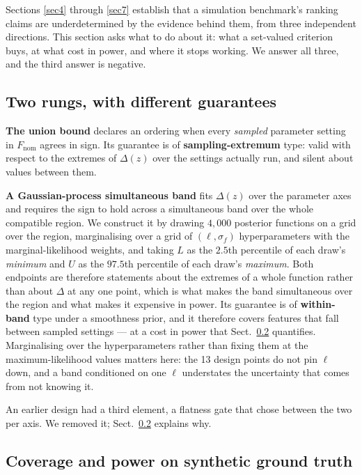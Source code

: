\documentclass[pdflatex,iicol,sn-apa]{sn-jnl}
\theoremstyle{remark}
\begin{document}
Sections \ref{sec4} through \ref{sec7} establish that a simulation benchmark's ranking claims are
underdetermined by the evidence behind them, from three independent directions. This section asks
what to do about it: what a set-valued criterion buys, at what cost in power, and where it stops
working. We answer all three, and the third answer is negative.

\subsection{Two rungs, with different guarantees}\label{subsec8_1}

\textbf{The union bound} declares an ordering when every \emph{sampled} parameter setting in
$F_{\mathrm{nom}}$ agrees in sign. Its guarantee is of \textbf{sampling-extremum} type: valid with respect
to the extremes of $\Delta(z)$ over the settings actually run, and silent about values between them.

\textbf{A Gaussian-process simultaneous band} fits $\Delta(z)$ over the parameter axes and requires
the sign to hold across a simultaneous band over the whole compatible region. We construct it by
drawing $4{,}000$ posterior functions on a grid over the region, marginalising over a grid of
$(\ell, \sigma_f)$ hyperparameters with the marginal-likelihood weights, and taking $L$ as the
$2.5$th percentile of each draw's \emph{minimum} and $U$ as the $97.5$th percentile of each draw's
\emph{maximum}. Both endpoints are therefore statements about the extremes of a whole function rather
than about $\Delta$ at any one point, which is what makes the band simultaneous over the region and
what makes it expensive in power. Its guarantee is of
\textbf{within-band} type under a smoothness prior, and it therefore covers features that fall
between sampled settings --- at a cost in power that Sect.~\ref{subsec8_2} quantifies. Marginalising
over the hyperparameters rather than fixing them at the maximum-likelihood values matters here: the
13 design points do not pin $\ell$ down, and a band conditioned on one $\ell$ understates the
uncertainty that comes from not knowing it.

An earlier design had a third element, a flatness gate that chose between the two per axis. We
removed it; Sect.~\ref{subsec8_2} explains why.

\subsection{Coverage and power on synthetic ground truth}\label{subsec8_2}
\end{document}
